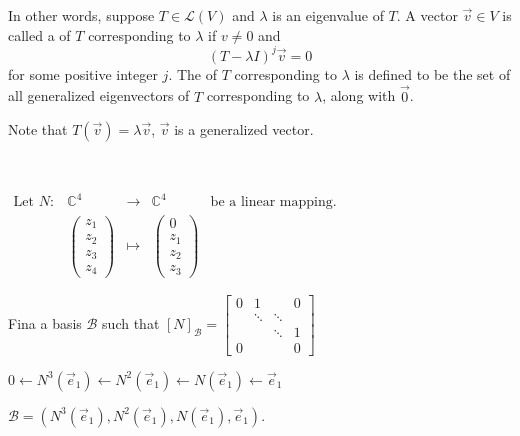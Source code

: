 \documentclass[11pt,fleqn]{book} %
\begin{document}
In other words, suppose $T \in \mathcal{L}(V)$ and $\lambda$ is an eigenvalue of $T$. A vector $\vec{v} \in V$ is called a  of $T$ corresponding to $\lambda$ if $v \neq 0$ and $$(T - \lambda I)^j\vec{v} = 0$$ for some positive integer $j$. The  of $T$ corresponding to $\lambda$ is defined to be the set of all generalized eigenvectors of $T$ corresponding to $\lambda$, along with $\vec{0}$. 

Note that $T(\vec{v}) = \lambda \vec{v}$, $\vec{v}$ is a generalized vector.

\begin{example}
{~~~}

    $\begin{matrix} \text{Let } N: &\mathbb{C}^4 &\to &\mathbb{C}^4 &\text{be a linear mapping. }\\ &\begin{pmatrix}z_1\\z_2\\z_3\\z_4\end{pmatrix} &\mapsto &\begin{pmatrix}0\\z_1\\z_2\\z_3\end{pmatrix} \end{matrix}$
    
    Fina a basis $\mathcal{B}$ such that $[N]_\mathcal{B} = \begin{bmatrix} 0 &1 & &0 \\ &\ddots &\ddots \\ & &\ddots & 1 \\ 0 & & &0 \end{bmatrix}$
        
    {\color{lightblue} $0 \leftarrow N^3(\vec{e}_1) \leftarrow N^2(\vec{e}_1) \leftarrow N(\vec{e}_1) \leftarrow \vec{e}_1$
        
    $\mathcal{B} = (N^3(\vec{e}_1), N^2(\vec{e}_1), N(\vec{e}_1), \vec{e}_1)$. }
\end{example}
\end{document}
